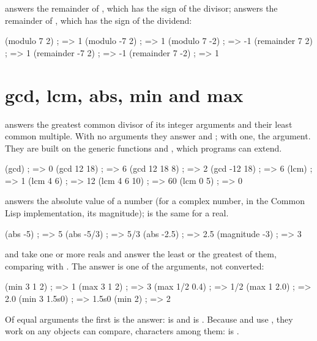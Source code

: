  answers the remainder of , which has the sign
of the divisor;  answers the remainder of
, which has the sign of the dividend:

\begin{dylan}
(modulo 7 2)        ; => 1
(modulo -7 2)       ; => 1
(modulo 7 -2)       ; => -1
(remainder 7 2)     ; => 1
(remainder -7 2)    ; => -1
(remainder 7 -2)    ; => 1
\end{dylan}

\section{gcd, lcm, abs, min and max}\label{sec:numbers-misc}

 answers the greatest common divisor of its integer arguments
and  their least common multiple. With no arguments they
answer  and ; with one, the argument. They are built on
the generic functions  and
, which programs can extend.

\begin{dylan}
(gcd)            ; => 0
(gcd 12 18)      ; => 6
(gcd 12 18 8)    ; => 2
(gcd -12 18)     ; => 6
(lcm)            ; => 1
(lcm 4 6)        ; => 12
(lcm 4 6 10)     ; => 60
(lcm 0 5)        ; => 0
\end{dylan}

 answers the absolute value of a number (for a complex number,
in the Common Lisp implementation, its magnitude); 
is the same for a real.

\begin{dylan}
(abs -5)       ; => 5
(abs -5/3)     ; => 5/3
(abs -2.5)     ; => 2.5
(magnitude -3) ; => 3
\end{dylan}

 and  take one or more reals and answer the least or
the greatest of them, comparing with . The answer is one
of the arguments, not converted:

\begin{dylan}
(min 3 1 2)       ; => 1
(max 3 1 2)       ; => 3
(max 1/2 0.4)     ; => 1/2
(max 1 2.0)       ; => 2.0
(min 3 1.5s0)     ; => 1.5s0
(min 2)           ; => 2
\end{dylan}

\noindent Of equal arguments the first is the answer:  is
 and  is .
Because  and  use , they work on any
objects \code{<} can compare, characters among them:
 is .


